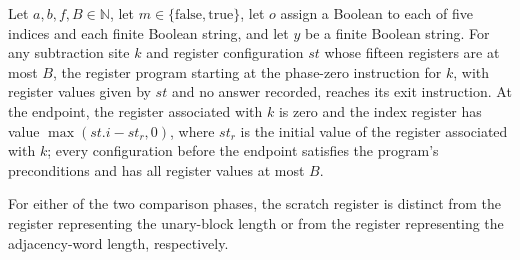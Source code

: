 \begin{theorem}
\label{Complexity.PathHard.sb_run}
\leanok
{}
Let $a,b,f,B\in\mathbb{N}$, let $m\in\{\mathrm{false},\mathrm{true}\}$, let $o$ assign a
Boolean to each of five indices and each finite Boolean string, and let $y$ be a finite
Boolean string. For any subtraction site $k$ and register configuration $st$ whose
fifteen registers are at most $B$, the register program starting at the phase-zero
instruction for $k$, with register values given by $st$ and no answer recorded, reaches
its exit instruction. At the endpoint, the register associated with $k$ is zero and the
index register has value $\max(st.i-st_{r},0)$, where $st_r$ is the initial value of the
register associated with $k$; every configuration before the endpoint satisfies the
program's preconditions and has all register values at most $B$.
\end{theorem}

\begin{lemma}
\label{Complexity.PathHard.le_ne}
\leanok
{}
For either of the two comparison phases, the scratch register is distinct from the
register representing the unary-block length or from the register representing the
adjacency-word length, respectively.
\end{lemma}

